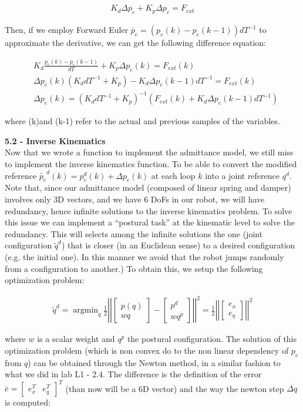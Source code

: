 \documentclass[11pt]{article}
\DeclareMathOperator*{\argmin}{argmin}
\newcommand{\mat}[1]{\ensuremath{\begin{bmatrix}#1\end{bmatrix}}}	%
\begin{document}
\begin{align*}
K_d \Delta\dot{ p_e} + K_p{\Delta p_e}  =  F_{ext}  
\end{align*}
 
Then, if  we  employ Forward Euler $\dot{p_e} = (p_e(k)- p_e(k-1))dT^{-1}$ to approximate the derivative, we can get the following difference equation:

\begin{align*}
&K_d \frac{p_e(k)- p_e(k-1)}{dT}  + K_p \Delta p_e(k)  =  F_{ext}(k)  \\
&\Delta p_e(k) (K_d dT^{-1} + K_p ) - K_d \Delta p_e(k-1)dT^{-1} =  F_{ext}(k)\\
&\Delta p_e(k) =  (K_d dT^{-1} + K_p )^{-1} (F_{ext}(k) + K_d \Delta p_e(k-1)dT^{-1})
\end{align*}

where (k)and (k-1) refer to the actual and previous samples of the variables. 


\quad

\noindent
\textbf{5.2 - Inverse Kinematics}\\
Now that we wrote a function to implement the admittance model, we still miss to implement the inverse kinematics function. To be able to convert the modified reference $\tilde{p_e}^d(k) = p_e^d(k) +  \Delta p_e(k)$  at each loop $k$ into a joint reference $q^d$. Note that, since our admittance model (composed of linear spring and damper)  involves only 3D vectors, and we have 6 DoFs in our robot, we will have redundancy, hence  infinite solutions to the inverse kinematics problem. 
To solve this issue we can implement a ``postural task'' at the kinematic level to solve the redundancy.
This will  selects among the infinite solutions the one (joint configuration $\tilde{q}^d$) that is closer (in an Euclidean sense) to a desired configuration (e.g. the initial one). In this manner we avoid that the robot jumps randomly from a configuration to another.) 
To obtain this, we setup the following optimization problem:

\begin{align*}
\tilde{q}^d = \argmin_q \frac{1}{2} \left|\left| \mat{p(q) \\ w q } - \mat{p^d \\ w q^p }   \right|\right|^2 = \frac{1}{2} \left|\left| \mat{ e_x \\ e_q }   \right|\right|^2
\end{align*}

where $w$ is a scalar weight and $q^p$ the postural configuration. The solution of this optimization problem (which is non convex do to the non linear dependency of $p_e$ from $q$) can be obtained through the Newton method, in a similar fashion to what we did in lab L1 - 2.4. The difference is the definition of the error $\bar{e} = \mat{e_x^T & e_q^T}^T$ (than now will be a 6D vector) and the way the newton step $\Delta q$ is computed:
\end{document}
